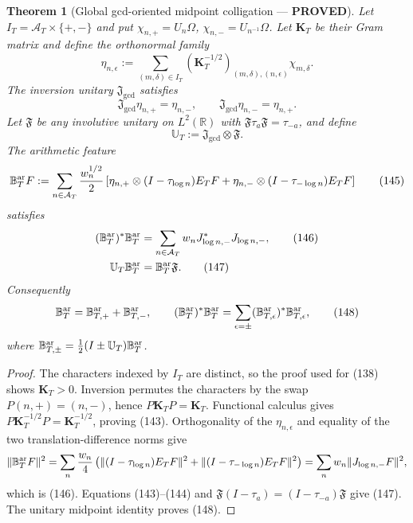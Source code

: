 \documentclass[11pt]{article}
\newtheorem{theorem}{Theorem}
\newcommand{\PROVED}{\textcolor{green!45!black}{\textbf{PROVED}}}
\begin{document}
\begin{theorem}[Global gcd-oriented midpoint colligation --- \PROVED]
Let $I_T=\mathcal A_T\times\{+,-\}$ and put
$\chi_{n,+}=U_n\Omega$, $\chi_{n,-}=U_{n^{-1}}\Omega$.  Let
$\mathbf K_T$ be their Gram matrix and define the orthonormal family
\begin{equation}
 \eta_{n,\epsilon}:=\sum_{(m,\delta)\in I_T}
 (\mathbf K_T^{-1/2})_{(m,\delta),(n,\epsilon)}
 \chi_{m,\delta}.                                      \tag{142}
\end{equation}
The inversion unitary $\mathfrak J_{\gcd}$ satisfies
\begin{equation}
 \mathfrak J_{\gcd}\eta_{n,+}=\eta_{n,-},
 \qquad \mathfrak J_{\gcd}\eta_{n,-}=\eta_{n,+}.     \tag{143}
\end{equation}
Let $\mathfrak F$ be any involutive unitary on $L^2(\mathbb R)$ with
$\mathfrak F\tau_a\mathfrak F=\tau_{-a}$, and define
\begin{equation}
 \mathbb U_T:=\mathfrak J_{\gcd}\otimes\mathfrak F.   \tag{144}
\end{equation}
The arithmetic feature
\begin{equation}
 \mathbb B_T^{\rm ar}F
 :=\sum_{n\in\mathcal A_T}\frac{w_n^{1/2}}2
 \left[
  \eta_{n,+}\otimes(I-\tau_{\log n})E_TF
 +\eta_{n,-}\otimes(I-\tau_{-\log n})E_TF
 \right]                                               \tag{145}
\end{equation}
satisfies
\begin{align}
 (\mathbb B_T^{\rm ar})^*\mathbb B_T^{\rm ar}
 &=\sum_{n\in\mathcal A_T}w_nJ_{\log n,-}^*J_{\log n,-}, \tag{146}\\
 \mathbb U_T\mathbb B_T^{\rm ar}
 &=\mathbb B_T^{\rm ar}\mathfrak F.                  \tag{147}
\end{align}
Consequently
\begin{equation}
 \mathbb B_T^{\rm ar}
 =\mathbb B_{T,+}^{\rm ar}+\mathbb B_{T,-}^{\rm ar},
 \qquad
 (\mathbb B_T^{\rm ar})^*\mathbb B_T^{\rm ar}
 =\sum_{\epsilon=\pm}
   (\mathbb B_{T,\epsilon}^{\rm ar})^*
    \mathbb B_{T,\epsilon}^{\rm ar},                  \tag{148}
\end{equation}
where
$\mathbb B_{T,\pm}^{\rm ar}=\tfrac12(I\pm\mathbb U_T)
\mathbb B_T^{\rm ar}$.
\end{theorem}

\begin{proof}
The characters indexed by $I_T$ are distinct, so the proof used for (138)
shows $\mathbf K_T>0$.  Inversion permutes the characters by the swap
$P(n,+)=(n,-)$, hence $P\mathbf K_TP=\mathbf K_T$.
Functional calculus gives $P\mathbf K_T^{-1/2}P=\mathbf K_T^{-1/2}$,
proving (143).  Orthogonality of the $\eta_{n,\epsilon}$ and equality of the
two translation-difference norms give
\[
 \|\mathbb B_T^{\rm ar}F\|^2
 =\sum_n\frac{w_n}{4}
  \left(\|(I-\tau_{\log n})E_TF\|^2
       +\|(I-\tau_{-\log n})E_TF\|^2\right)
 =\sum_nw_n\|J_{\log n,-}F\|^2,
\]
which is (146).  Equations (143)--(144) and
$\mathfrak F(I-\tau_a)=(I-\tau_{-a})\mathfrak F$ give (147).
The unitary midpoint identity proves (148).
\end{proof}
\end{document}
